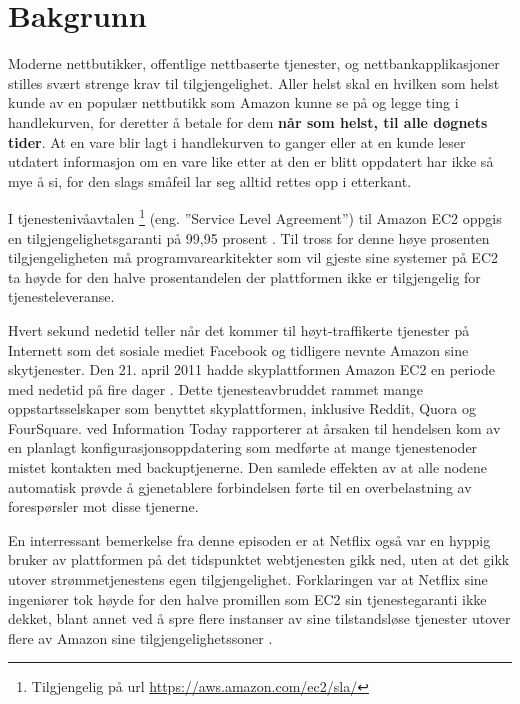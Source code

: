 \section{Bakgrunn}

Moderne nettbutikker, offentlige nettbaserte tjenester, og nettbankapplikasjoner stilles svært strenge krav til tilgjengelighet. Aller helst skal en hvilken som helst kunde av en populær nettbutikk som Amazon kunne se på og legge ting i handlekurven, for deretter å betale for dem \textbf{når som helst, til alle døgnets tider}. At en vare blir lagt i handlekurven to ganger eller at en kunde leser utdatert informasjon om en vare like etter at den er blitt oppdatert har ikke så mye å si, for den slags småfeil lar seg alltid rettes opp i etterkant.

I tjenestenivåavtalen \footnote{Tilgjengelig på url \url{https://aws.amazon.com/ec2/sla/}} (eng. ''Service Level Agreement'') til Amazon EC2 oppgis en tilgjengelighetsgaranti på 99,95 prosent \citep{BCK2013}. Til tross for denne høye prosenten tilgjengeligheten må programvarearkitekter som vil gjeste sine systemer på EC2 ta høyde for den halve prosentandelen der plattformen ikke er tilgjengelig for tjenesteleveranse.

Hvert sekund nedetid teller når det kommer til høyt-traffikerte tjenester på Internett som det sosiale mediet Facebook og tidligere nevnte Amazon sine skytjenester. Den 21. april 2011 hadde skyplattformen Amazon EC2 en periode med nedetid på fire dager \citep{BCK2013}. Dette tjenesteavbruddet rammet mange oppstartsselskaper som benyttet skyplattformen, inklusive Reddit, Quora og FourSquare. \cite{Schiller2011} ved Information Today rapporterer at årsaken til hendelsen kom av en planlagt konfigurasjonsoppdatering som medførte at mange tjenestenoder mistet kontakten med backuptjenerne. Den samlede effekten av at alle nodene automatisk prøvde å gjenetablere forbindelsen førte til en overbelastning av forespørsler mot disse tjenerne.

En interressant bemerkelse fra denne episoden er at Netflix også var en hyppig bruker av plattformen på det tidspunktet webtjenesten gikk ned, uten at det gikk utover strømmetjenestens egen tilgjengelighet. Forklaringen var at Netflix sine ingeniører tok høyde for den halve promillen som EC2 sin tjenestegaranti ikke dekket, blant annet ved å spre flere instanser av sine tilstandsløse tjenester utover flere av Amazon sine tilgjengelighetssoner \citep{BCK2013}.

